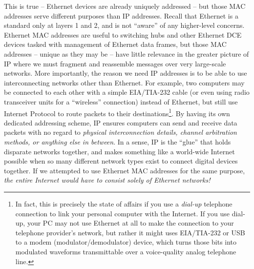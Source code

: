 This is true -- Ethernet devices are already uniquely addressed -- but those MAC addresses serve different purposes than IP addresses.  Recall that Ethernet is a standard only at layers 1 and 2, and is not ``aware'' of any higher-level concerns.  Ethernet MAC addresses are useful to switching hubs and other Ethernet DCE devices tasked with management of Ethernet data frames, but those MAC addresses -- unique as they may be -- have little relevance in the greater picture of IP where we must fragment and reassemble messages over very large-scale networks.  More importantly, the reason we need IP addresses is to be able to use interconnecting networks other than Ethernet.  For example, two computers may be connected to each other with a simple EIA/TIA-232 cable (or even using radio transceiver units for a ``wireless'' connection) instead of Ethernet, but still use Internet Protocol to route packets to their destinations\footnote{In fact, this is precisely the state of affairs if you use a \textit{dial-up} telephone connection to link your personal computer with the Internet.  If you use dial-up, your PC may not use Ethernet at all to make the connection to your telephone provider's network, but rather it might uses EIA/TIA-232 or USB to a modem (modulator/demodulator) device, which turns those bits into modulated waveforms transmittable over a voice-quality analog telephone line.}.  By having its own dedicated addressing scheme, IP ensures computers can send and receive data packets with no regard to \textit{physical interconnection details, channel arbitration methods, or anything else in between}.  In a sense, IP is the ``glue'' that holds disparate networks together, and makes something like a world-wide Internet possible when so many different network types exist to connect digital devices together.  If we attempted to use Ethernet MAC addresses for the same purpose, \textit{the entire Internet would have to consist solely of Ethernet networks!}     


